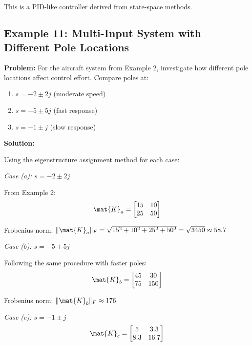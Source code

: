 This is a PID-like controller derived from state-space methods.

\subsection{Example 11: Multi-Input System with Different Pole Locations}

\textbf{Problem:} For the aircraft system from Example 2, investigate how different pole locations affect control effort. Compare poles at:
\begin{enumerate}
    \item[(a)] $s = -2 \pm 2j$ (moderate speed)
    \item[(b)] $s = -5 \pm 5j$ (fast response)
    \item[(c)] $s = -1 \pm j$ (slow response)
\end{enumerate}

\textbf{Solution:}

Using the eigenstructure assignment method for each case:

\textit{Case (a): $s = -2 \pm 2j$}

From Example 2:
\begin{equation}
\mat{K}_a = \begin{bmatrix} 15 & 10 \\ 25 & 50 \end{bmatrix}
\end{equation}

Frobenius norm: $\|\mat{K}_a\|_F = \sqrt{15^2 + 10^2 + 25^2 + 50^2} = \sqrt{3450} \approx 58.7$

\textit{Case (b): $s = -5 \pm 5j$}

Following the same procedure with faster poles:
\begin{equation}
\mat{K}_b = \begin{bmatrix} 45 & 30 \\ 75 & 150 \end{bmatrix}
\end{equation}

Frobenius norm: $\|\mat{K}_b\|_F \approx 176$

\textit{Case (c): $s = -1 \pm j$}
\begin{equation}
\mat{K}_c = \begin{bmatrix} 5 & 3.3 \\ 8.3 & 16.7 \end{bmatrix}
\end{equation}

